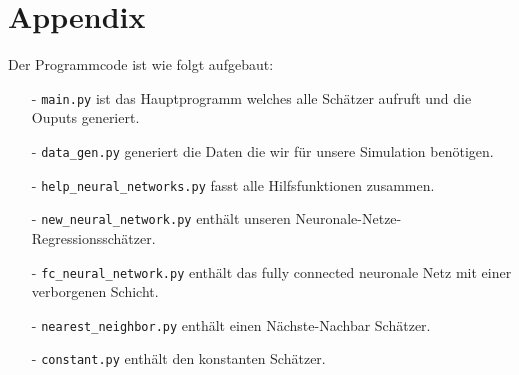\chapter*{Appendix}
\label{chap:app}

Der Programmcode ist wie folgt aufgebaut:
\begin{itemize}
    \item[-] \texttt{main.py} ist das Hauptprogramm welches alle Schätzer aufruft und die Ouputs generiert.
    \item[-] \texttt{data\_gen.py} generiert die Daten die wir für unsere Simulation benötigen.
    \item[-] \texttt{help\_neural\_networks.py} fasst alle Hilfsfunktionen zusammen.
    \item[-] \texttt{new\_neural\_network.py} enthält unseren Neuronale-Netze-Regressionsschätzer.
    \item[-] \texttt{fc\_neural\_network.py} enthält das fully connected neuronale Netz mit einer verborgenen Schicht.
    \item[-] \texttt{nearest\_neighbor.py} enthält einen Nächste-Nachbar Schätzer.
    \item[-] \texttt{constant.py} enthält den konstanten Schätzer.
\end{itemize}
\renewcommand\lstlistingname{Listing}






